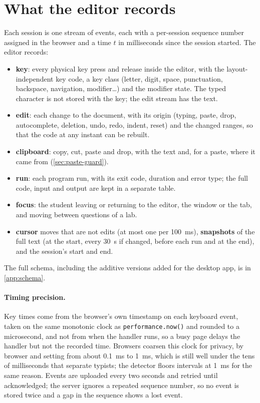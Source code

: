 \section{What the editor records}
\label{sec:logging}
Each session is one stream of events, each with a per-session sequence number
assigned in the browser and a time $t$ in milliseconds since the session
started. The editor records:
\begin{itemize}[nosep]
  \item \textbf{key}: every physical key press and release inside the editor,
  with the layout-independent key code, a key class (letter, digit, space,
  punctuation, backspace, navigation, modifier\ldots) and the modifier state.
  The typed character is not stored with the key; the edit stream has the text.
  \item \textbf{edit}: each change to the document, with its origin (typing,
  paste, drop, autocomplete, deletion, undo, redo, indent, reset) and the
  changed ranges, so that the code at any instant can be rebuilt.
  \item \textbf{clipboard}: copy, cut, paste and drop, with the text and, for a
  paste, where it came from (\cref{sec:paste-guard}).
  \item \textbf{run}: each program run, with its exit code, duration and error
  type; the full code, input and output are kept in a separate table.
  \item \textbf{focus}: the student leaving or returning to the editor, the
  window or the tab, and moving between questions of a lab.
  \item \textbf{cursor} moves that are not edits (at most one per
  \SI{100}{\milli\second}), \textbf{snapshots} of the full text (at the start,
  every \SI{30}{\second} if changed, before each run and at the end), and the
  session's start and end.
\end{itemize}
The full schema, including the additive versions added for the desktop app,
is in \cref{app:schema}.

\paragraph{Timing precision.} Key times come from the browser's own
timestamp on each keyboard event, taken on the same monotonic clock as
\texttt{performance.now()} and rounded to a microsecond, and not from when the
handler runs, so a busy page delays the handler but not the recorded time.
Browsers coarsen this clock for privacy, by
browser and setting from about \SI{0.1}{\milli\second} to
\SI{1}{\milli\second}, which is still well under the tens of milliseconds that
separate typists; the detector floors intervals at \SI{1}{\milli\second} for
the same reason. Events are uploaded every two seconds and retried until acknowledged;
the server ignores a repeated sequence number, so no event is stored twice and
a gap in the sequence shows a lost event.

